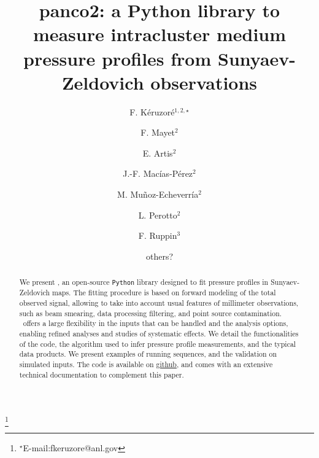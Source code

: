 \documentclass[numberedappendix,twocolumn,twocolappendix,apj]{openjournal}
\begin{document}
\title{panco2: a Python library to measure intracluster medium pressure profiles from Sunyaev-Zeldovich observations}

\author{F. K\'eruzor\'e$^{1,2,\star}$}
\author{F. Mayet$^{2}$}
\author{E. Artis$^{2}$}
\author{J.-F. Mac\'ias-P\'erez$^{2}$}
\author{M. Mu\~noz-Echeverr\'ia$^{2}$}
\author{L. Perotto$^{2}$}
\author{F. Ruppin$^{3}$}
\author{others?}

\thanks{$^{\star}$E-mail:fkeruzore@anl.gov}



\begin{abstract}
    We present \panco, an open-source \texttt{Python} library designed to fit pressure profiles in Sunyaev-Zeldovich maps.
    The fitting procedure is based on forward modeling of the total observed signal, allowing to take into account usual features of millimeter observations, such as beam smearing, data processing filtering, and point source contamination.
    \panco\ offers a large flexibility in the inputs that can be handled and the analysis options, enabling refined analyses and studies of systematic effects.
    We detail the functionalities of the code, the algorithm used to infer pressure profile measurements, and the typical data products.
    We present examples of running sequences, and the validation on simulated inputs.
    The code is available on \href{https://github.com/fkeruzore/panco2}{github}, and comes with an extensive technical documentation to complement this paper.
\end{abstract}


\maketitle

\vspace{1cm}
\end{document}
